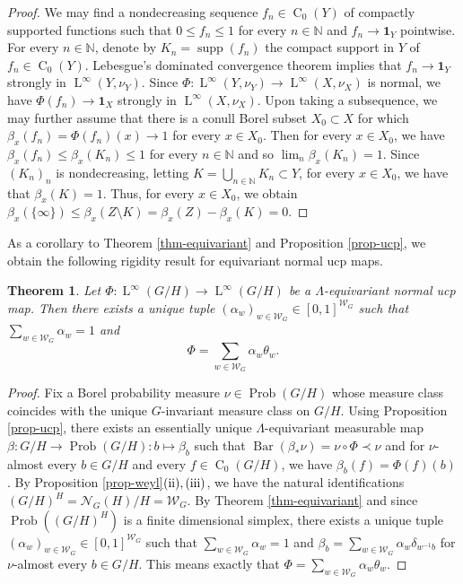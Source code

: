 \documentclass[11pt]{amsart}
\numberwithin{equation}{section}
\theoremstyle{plain}
\newtheorem{thm}{Theorem}[section]
\theoremstyle{definition}
\newcommand{\N}{\mathbb{N}}
\newcommand{\Prob}{\operatorname{Prob}}
\newcommand{\supp}{\operatorname{supp}}
\newcommand{\bary}{\operatorname{Bar}}
\newcommand{\rC}{\operatorname{C}}
\newcommand{\rL}{\operatorname{ L}}
\begin{document}
\begin{proof}
We may find a nondecreasing sequence $f_n \in \rC_0(Y)$ of compactly supported functions such that $0 \leq f_n \leq 1$ for every $n \in \N$ and $f_n \to \mathbf 1_Y$ pointwise. For every $n \in \N$, denote by $K_n = \supp(f_n)$ the compact support in $Y$ of $f_n \in \rC_0(Y)$. Lebesgue's dominated convergence theorem implies that $f_n \to \mathbf 1_Y$ strongly in $\rL^\infty(Y, \nu_Y)$. Since $\Phi : \rL^\infty(Y, \nu_Y) \to \rL^\infty(X, \nu_X)$ is normal, we have $\Phi(f_n) \to \mathbf 1_X$ strongly in $\rL^\infty(X, \nu_X)$. Upon taking a subsequence, we may further assume that there is a conull Borel subset $X_0 \subset X$ for which $\beta_x(f_n) = \Phi(f_n)(x) \to 1$ for every $x \in X_0$. Then for every $x \in X_0$, we have $\beta_x(f_n) \leq \beta_x(K_n) \leq 1$ for every $n \in \N$ and so $\lim_n \beta_x(K_n) = 1$. Since $(K_n)_n$ is nondecreasing, letting $K = \bigcup_{n \in \N} K_n \subset Y$, for every $x \in X_0$, we have that $\beta_x(K) = 1$. Thus, for every $x \in X_0$, we obtain $\beta_x(\{\infty\}) \leq \beta_x(Z \setminus K) = \beta_x(Z) - \beta_x(K) = 0$.
\end{proof}

As a corollary to Theorem \ref{thm-equivariant} and Proposition \ref{prop-ucp}, we obtain the following rigidity result for equivariant normal ucp maps.


\begin{thm}\label{thm-rigidity-ucp}
Let $\Phi : \rL^\infty(G/H) \to \rL^\infty(G/H)$ be a $\Lambda$-equivariant normal ucp map. Then there exists a unique tuple $(\alpha_w)_{w \in \mathscr W_G} \in [0, 1]^{\mathscr W_G}$ such that $\sum_{w \in \mathscr W_G} \alpha_w = 1$ and 
$$\Phi = \sum_{w \in \mathscr W_G} \alpha_w \theta_w.$$
\end{thm}

\begin{proof}
Fix a Borel probability measure $\nu \in \Prob(G/H)$ whose measure class coincides with the unique $G$-invariant measure class on $G/H$. Using Proposition \ref{prop-ucp}, there exists an essentially unique $\Lambda$-equivariant measurable map $\beta : G/H \to \Prob(G/H) : b \mapsto \beta_b$ such that $\bary(\beta_\ast \nu) = \nu \circ \Phi \prec \nu$ and for $\nu$-almost every $b \in G/H$ and every $f \in \rC_0(G/H)$, we have $\beta_b(f) = \Phi(f)(b)$. By Proposition \ref{prop-weyl}$(\rm ii), (\rm iii)$, we have the natural identifications $(G/H)^H =  \mathscr N_{G}(H)/H = \mathscr W_G$. By Theorem \ref{thm-equivariant} and since $\Prob((G/H)^H)$ is a finite dimensional simplex, there exists a unique tuple $(\alpha_w)_{w \in \mathscr W_G} \in [0, 1]^{\mathscr W_G}$ such that $\sum_{w \in \mathscr W_G} \alpha_w = 1$ and $\beta_b = \sum_{w \in \mathscr W_G} \alpha_w \delta_{w^{-1} b}$ for $\nu$-almost every $b \in G/H$. This means exactly that $\Phi = \sum_{w \in \mathscr W_G} \alpha_w \theta_w$.
\end{proof}
\end{document}

